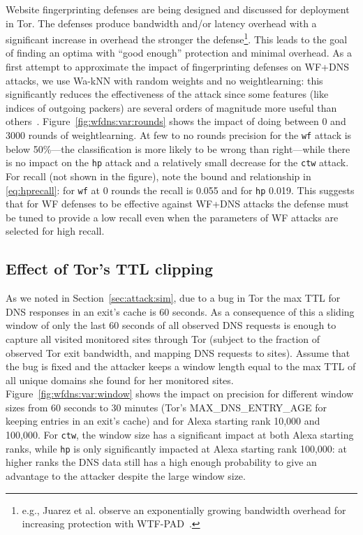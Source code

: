 Website fingerprinting defenses are being
designed and discussed for deployment in Tor.
The defenses produce bandwidth and/or latency overhead with a significant
increase in overhead the stronger the defense\footnote{e.g., Juarez et al.
observe an exponentially growing bandwidth overhead for increasing protection
with WTF-PAD~\cite{DBLP:journals/corr/JuarezIPDW15}.}.
This leads to the goal of finding an optima with ``good enough''
protection and minimal overhead.
As a first attempt to approximate the impact of fingerprinting
defenses on WF+DNS attacks, we use Wa-kNN with
random weights and no weightlearning: this significantly reduces the
effectiveness of the attack since some features (like indices of outgoing
packers) are several orders of magnitude more useful
than others~\cite{DBLP:journals/corr/JuarezIPDW15}.
Figure~\ref{fig:wfdns:var:rounds} shows the impact of doing between 0 and 3000
rounds of weightlearning. At few to no rounds precision for the \texttt{wf}
attack is below 50\%---the classification is more likely to be wrong than
right---while there is no impact on the \texttt{hp} attack and a relatively
small decrease for the \texttt{ctw} attack.
For recall (not shown in the figure), note the bound and relationship in
\ref{eq:hprecall}: for \texttt{wf} at 0 rounds the recall is 0.055 and for
\texttt{hp} 0.019. This suggests that for WF defenses to
be effective against WF+DNS attacks the defense must be tuned to provide a
low recall even when the parameters of WF attacks are selected for high
recall.

\subsection{Effect of Tor's TTL clipping}

As we noted in Section~\ref{sec:attack:sim}, due to a bug in Tor the max TTL
for DNS responses in an exit's cache is 60 seconds. As a consequence of this
a sliding window of only the last 60 seconds of all observed DNS requests is
enough to capture all visited monitored sites through Tor (subject to the
fraction of observed Tor exit bandwidth, and mapping DNS requests to sites).
Assume that the bug is fixed and the attacker keeps a window length equal
to the max TTL of all unique domains she found for her monitored sites.
Figure~\ref{fig:wfdns:var:window} shows the impact on precision for different
window sizes from 60 seconds to 30 minutes (Tor's MAX\_DNS\_ENTRY\_AGE
for keeping entries in an exit's cache) and for Alexa starting rank 10,000 and
100,000. For \texttt{ctw}, the window size has a significant impact at both
Alexa starting ranks, while \texttt{hp} is only significantly impacted at
Alexa starting rank 100,000: at higher ranks the DNS data still has a high
enough probability to give an advantage to the attacker despite the large
window size.

